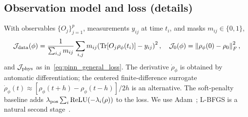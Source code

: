 \documentclass[11pt]{article}
\DeclareMathOperator{\Tr}{Tr}
\newcommand{\calJ}{\mathcal{J}}
\newcommand{\norm}[1]{\left\lVert #1 \right\rVert}
\newcommand{\rhophi}{\rho_{\phi}}
\begin{document}
\subsection{Observation model and loss (details)}
\label{sec:loss}
With observables $\{O_j\}_{j=1}^{p}$, measurements $y_{ij}$ at time $t_i$, and masks $m_{ij}\in\{0,1\}$,
\begin{equation}
    \calJ_{\rm data}(\phi)=\frac{1}{\sum_{i,j}m_{ij}}\sum_{i,j}m_{ij}\!\left(\Tr[O_j\rhophi(t_i)]-y_{ij}\right)^2,\quad
    \calJ_0(\phi)=\norm{\rhophi(0)-\rho_0}_F^2,
    \label{eq:data_ic_loss}
\end{equation}
and $\calJ_{\rm phys}$ as in~\eqref{eq:pinn_general_loss}. The derivative $\dot\rhophi$ is obtained by automatic differentiation; the centered finite-difference surrogate $\dot\rhophi(t)\approx[\rhophi(t+h)-\rhophi(t-h)]/2h$ is an alternative. The soft-penalty baseline adds $\lambda_{\rm pos}\sum_i\mathrm{ReLU}(-\lambda_i(\rho))$ to the loss. We use Adam~\cite{kingma2015adam}; L-BFGS is a natural second stage~\cite{liu1989limited}.
\end{document}

